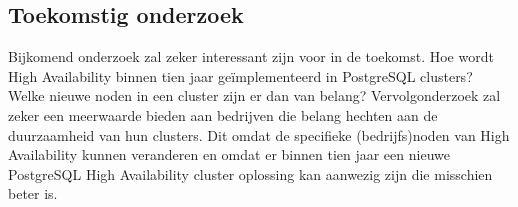 \documentclass[a0,portrait]{a0poster}
\begin{document}
\begin{multicols}{2}
\color{HoGentAccent1} 
\section*{Toekomstig onderzoek}
\color{black}
Bijkomend onderzoek zal zeker interessant zijn voor in de toekomst. Hoe wordt High Availability binnen tien jaar geïmplementeerd in PostgreSQL clusters? Welke nieuwe noden in een cluster zijn er dan van belang? Vervolgonderzoek zal zeker een meerwaarde bieden aan bedrijven die belang hechten aan de duurzaamheid van hun clusters.
Dit omdat de specifieke (bedrijfs)noden van High Availability kunnen veranderen en omdat er binnen tien jaar een nieuwe PostgreSQL High Availability cluster oplossing kan aanwezig zijn die misschien beter is.



\end{multicols}
\end{document}
